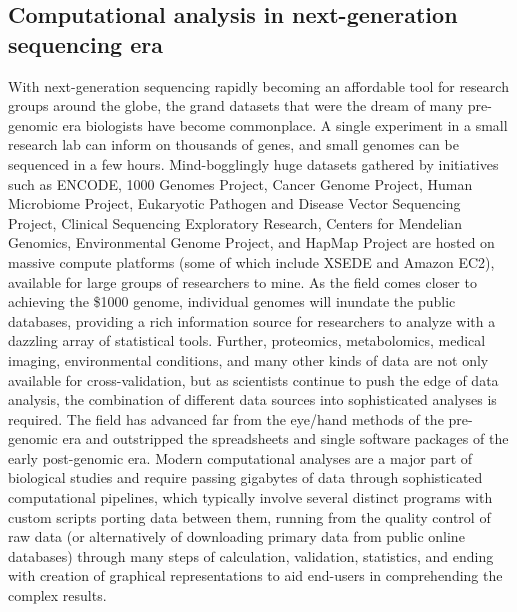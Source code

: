\documentclass[ChapterTOCs,krantz2]{krantz} %
\begin{document}
\subsection{Computational analysis in next-generation sequencing era}

With next-generation sequencing rapidly becoming an affordable tool
for research groups around the globe, the grand datasets that were the
dream of many pre-genomic era biologists have become commonplace.  A single
experiment in a small research lab can inform on
thousands of genes, and small genomes can be sequenced in a few hours.
Mind-bogglingly huge datasets gathered by initiatives such as ENCODE\cite{Encode2004,Myers2011}, 
1000 Genomes Project\cite{Altshuler2010}, 
Cancer Genome Project\cite{Cosmic2011}, Human Microbiome Project\cite{Lewis2012}, 
Eukaryotic Pathogen and Disease Vector Sequencing Project\cite{EPDVSP}, 
Clinical Sequencing Exploratory Research\cite{CSER}, 
Centers for Mendelian Genomics\cite{CMG}, Environmental Genome Project\cite{EGP}, 
and HapMap Project\cite{IHP} are hosted on
massive compute platforms
(some of which include XSEDE\cite{Xsede} and Amazon EC2\cite{AEC2}), available for large groups of 
researchers to mine.  As the field comes closer to achieving the 
\$1000 genome\cite{Mardis2006}, individual genomes will inundate the 
public databases, providing a rich information source for
researchers to analyze with a dazzling array of statistical tools.  Further,
proteomics, metabolomics, medical imaging, environmental conditions, and many
other kinds of data are not only available for cross-validation, but as
scientists continue to push the edge of data analysis, the combination of
different data sources into sophisticated analyses is required.  The field has
advanced far from the eye/hand methods of the pre-genomic era and outstripped
the spreadsheets and single software packages of the early post-genomic era.  
Modern computational analyses are a major part of biological studies \cite{Zhulin2009}
and require passing gigabytes of data through sophisticated computational
pipelines, which typically involve several distinct programs with custom
scripts porting data between them, running from the quality control of raw data
(or alternatively of downloading primary data from public online databases)
through many steps of calculation, validation, statistics, and ending with
creation of graphical representations to aid end-users in comprehending the
complex results.
\end{document}
